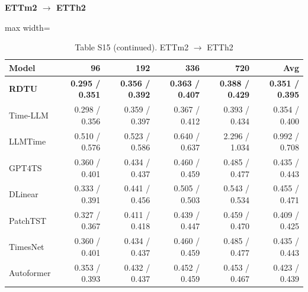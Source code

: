 \begin{table}[H]\centering\small
\caption*{Table S15 (continued). ETTm2 $\to$ ETTh2}
\textbf{ETTm2 $\to$ ETTh2}\par\smallskip
\begin{adjustbox}{max width=\linewidth}\begin{tabular}{lrrrrr}\toprule
\textbf{Model} & \textbf{96} & \textbf{192} & \textbf{336} & \textbf{720} & \textbf{Avg}\\\midrule
\rowcolor{blue!5}
\textbf{RDTU} & \textbf{0.295 / 0.351} & \textbf{0.356 / 0.392} & \textbf{0.363 / 0.407} & \textbf{0.388 / 0.429} & \textbf{0.351 / 0.395}\\
Time-LLM & 0.298 / 0.356 & 0.359 / 0.397 & 0.367 / 0.412 & 0.393 / 0.434 & 0.354 / 0.400\\
LLMTime & 0.510 / 0.576 & 0.523 / 0.586 & 0.640 / 0.637 & 2.296 / 1.034 & 0.992 / 0.708\\
GPT4TS & 0.360 / 0.401 & 0.434 / 0.437 & 0.460 / 0.459 & 0.485 / 0.477 & 0.435 / 0.443\\
DLinear & 0.333 / 0.391 & 0.441 / 0.456 & 0.505 / 0.503 & 0.543 / 0.534 & 0.455 / 0.471\\
PatchTST & 0.327 / 0.367 & 0.411 / 0.418 & 0.439 / 0.447 & 0.459 / 0.470 & 0.409 / 0.425\\
TimesNet & 0.360 / 0.401 & 0.434 / 0.437 & 0.460 / 0.459 & 0.485 / 0.477 & 0.435 / 0.443\\
Autoformer & 0.353 / 0.393 & 0.432 / 0.437 & 0.452 / 0.459 & 0.453 / 0.467 & 0.423 / 0.439\\
\bottomrule\end{tabular}\end{adjustbox}\end{table}
